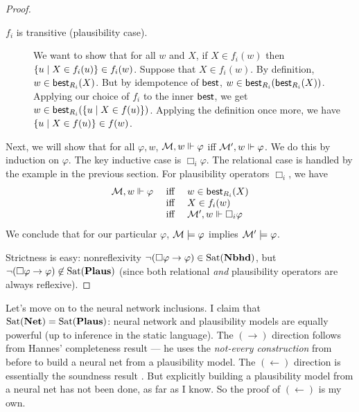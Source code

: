 \documentclass[letterpaper]{article}
\begin{document}
\begin{proof}
\begin{description}
        \item[$f_i$ is transitive (plausibility case).]
        We want to show that for all $w$ and $X$, if $X \in f_i(w)$ then $\{ u \mid X \in f_i(u) \} \in f_i(w)$.  Suppose that $X \in f_i(w)$.  By definition, $w \in \mathsf{best}_{R_i}(X)$.  But by idempotence of $\mathsf{best}$, $w \in \mathsf{best}_{R_i}(\mathsf{best}_{R_i}(X))$.  Applying our choice of $f_i$ to the inner $\mathsf{best}$, we get $w \in \mathsf{best}_{R_i}(\{ u \mid X \in f(u) \})$.  Applying the definition once more, we have $\{ u \mid X \in f(u) \} \in f(w)$.

    \end{description}

    Next, we will show that for all $\varphi, w$, $\mathcal{M}, w \Vdash \varphi$ iff $\mathcal{M}', w \Vdash \varphi$.  We do this by induction on $\varphi$.  The key inductive case is $\Box_i \varphi$.  The relational case is handled by the example in the previous section.  For plausibility operators $\Box_i$, we have
    \[
    \begin{array}{lcl}
        \mathcal{M}, w \Vdash \varphi & \mbox{ iff } & w \in \mathsf{best}_{R_i}(X) \\
        & \mbox{ iff } & X \in f_i(w) \\
        & \mbox{ iff } & \mathcal{M}', w \Vdash \Box_i \varphi
    \end{array}
    \]
    We conclude that for our particular $\varphi$, $\mathcal{M} \models \varphi$ implies $\mathcal{M}' \models \varphi$.

    Strictness is easy: nonreflexivity $\neg (\Box \varphi \to \varphi) \in \mathrm{Sat}( \textrm{\textbf{Nbhd}} )$, but $\neg (\Box \varphi \to \varphi) \not \in \mathrm{Sat}( \textrm{\textbf{Plaus}} )$ (since both relational \emph{and} plausibility operators are always reflexive).
\end{proof}

Let's move on to the neural network inclusions.  I claim that $\mathrm{Sat}( \textrm{\textbf{Net}} ) = \mathrm{Sat}( \textrm{\textbf{Plaus}} )$: neural network and plausibility models are equally powerful (up to inference in the static language).  The $(\to)$ direction follows from Hannes' completeness result \cite{leitgeb2001nonmonotonic, leitgeb2003nonmonotonic} --- he uses the \emph{not-every construction} from before to build a neural net from a plausibility model.  The $(\leftarrow)$ direction is essentially the soundness result \cite{leitgeb2001nonmonotonic, leitgeb2003nonmonotonic}. But explicitly building a plausibility model from a neural net has not been done, as far as I know.  So the proof of $(\leftarrow)$ is my own.

\end{document}

